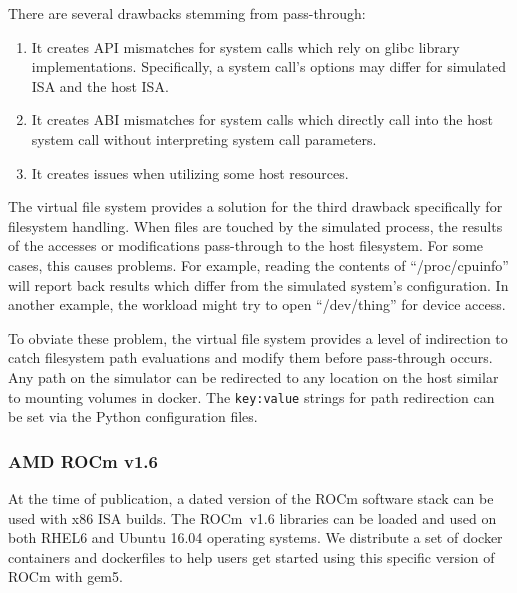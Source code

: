 There are several drawbacks stemming from pass-through:
\begin{enumerate}
    \item It creates API mismatches for system calls which rely on glibc library implementations. Specifically, a system call's options may differ for simulated ISA and the host ISA.
    \item It creates ABI mismatches for system calls which directly call into the host system call without interpreting system call parameters.
    \item It creates issues when utilizing some host resources.
\end{enumerate}

The virtual file system provides a solution for the third drawback specifically for filesystem handling.
When files are touched by the simulated process, the results of the accesses or modifications pass-through to the host filesystem.
For some cases, this causes problems.
For example, reading the contents of ``/proc/cpuinfo'' will report back results which differ from the simulated system's configuration.
In another example, the workload might try to open ``/dev/thing'' for device access.

To obviate these problem, the virtual file system provides a level of indirection to catch filesystem path evaluations and modify them before pass-through occurs.
Any path on the simulator can be redirected to any location on the host similar to mounting volumes in docker.
The \verb|key:value| strings for path redirection can be set via the Python configuration files.

\subsubsection{AMD ROCm v1.6}

At the time of publication, a dated version of the ROCm software stack can be used with x86 ISA builds.
The ROCm~v1.6 libraries can be loaded and used on both RHEL6 and Ubuntu 16.04 operating systems.
We distribute a set of docker containers and dockerfiles to help users get started using this specific version of ROCm with gem5.
